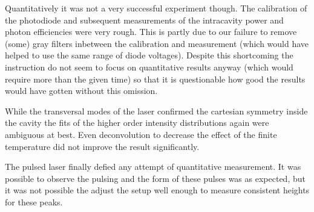 \documentclass[a4paper]{scrartcl}
\numberwithin{equation}{section}
\numberwithin{figure}{section}
\numberwithin{table}{section}
\begin{document}
Quantitatively it was not a very successful experiment though. The calibration of the photodiode and subsequent measurements of the intracavity power and photon efficiencies were very rough. This is partly due to our failure to remove (some) gray filters inbetween the calibration and measurement (which would have helped to use the same range of diode voltages). Despite this shortcoming the instruction do not seem to focus on quantitative results anyway (which would require more than the given time) so that it is questionable how good the results would have gotten without this omission.

While the transversal modes of the laser confirmed the cartesian symmetry inside the cavity the fits of the higher order intensity distributions again were ambiguous at best. Even deconvolution to decrease the effect of the finite temperature did not improve the result significantly.

The pulsed laser finally defied any attempt of quantitative measurement. It was possible to observe the pulsing and the form of these pulses was as expected, but it was not possible the adjust the setup well enough to measure consistent heights for these peaks.


 

\end{document}
